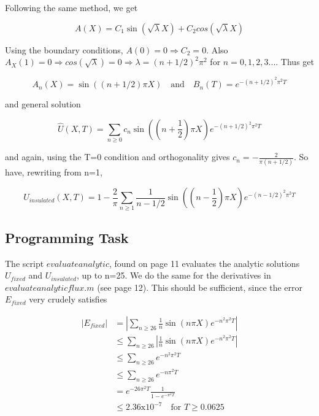 \documentclass[10pt,a4paper]{report}
\begin{document}
Following the same method, we get

\begin{equation*}
A(X)=C_1\sin(\sqrt{\lambda}X)+C_2cos(\sqrt{\lambda}X)
\end{equation*}

Using the boundary conditions, $A(0)=0\Rightarrow C_2=0$. Also $A_X(1)=0\Rightarrow cos(\sqrt{\lambda})=0 \Rightarrow \lambda=(n+1/2)^2\pi^2$ for $n=0,1,2,3...$. Thus get 

\begin{equation*}
A_n(X)=\sin((n+1/2)\pi X) \quad \text{and} \quad B_n(T)=e^{-(n+1/2)^2\pi^2 T}
\end{equation*}

and general solution

\begin{equation*}
\hat{U}(X,T)=\sum_{n\geq 0} c_n \sin((n+\frac{1}{2})\pi X) e^{-(n+1/2)^2\pi^2 T}
\end{equation*}

and again, using the T=0 condition and orthogonality gives $c_n=-\frac{2}{\pi(n+1/2)}$. So have, rewriting from n=1,

\begin{equation*}
U_{insulated}(X,T)=1-\frac{2}{\pi}\sum_{n\geq 1} \frac{1}{n-1/2}\sin((n-\frac{1}{2})\pi X) e^{-(n-1/2)^2\pi^2 T}
\end{equation*}

\subsection*{Programming Task}

The script $evaluateanalytic$, found on page 11 evaluates the analytic solutions $U_{fixed}$ and $U_{insulated}$, up to n=25. We do the same for the derivatives in $evaluateanalyticflux.m$ (see page 12). This should be sufficient, since the error $E_{fixed}$ very crudely satisfies

\begin{equation*}
\begin{split}
|E_{fixed}| & =  |\sum_{n\geq 26} \frac{1}{n}\sin(n\pi X) e^{-n^2\pi^2 T}| \\
 & \leq \sum_{n\geq 26} |\frac{1}{n}\sin(n\pi X) e^{-n^2\pi^2 T}|\\
 & \leq \sum_{n\geq 26} e^{-n^2\pi^2 T}\\
 & \leq \sum_{n\geq 26} e^{-n\pi^2 T}\\
 & = e^{-26\pi^2T}\frac{1}{1-e^{-\pi^2T}}\\
 & \leq 2.36\text{x}10^{-7} \quad \text{for } T\geq 0.0625 
\end{split} 
\end{equation*}
\end{document}
